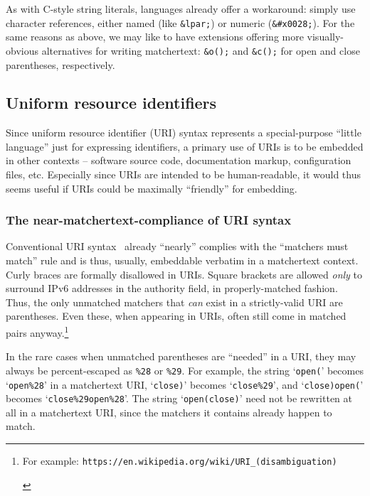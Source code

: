 As with C-style string literals,
\ml languages already offer a workaround:
simply use character references,
either named (like \verb|&lpar;|)
or numeric (\verb|&#x0028;|).
For the same reasons as above,
we may like to have extensions
offering more visually-obvious alternatives for writing matchertext:
\eg \verb|&o();| and \verb|&c();|
for open and close parentheses, 
respectively.


\subsection{Uniform resource identifiers}
\label{sec:embed:uri}

Since uniform resource identifier (URI) syntax represents
a special-purpose ``little language'' just for expressing identifiers,
a primary use of URIs is to be embedded in other contexts --
software source code, documentation markup, configuration files, etc.
Especially since URIs are intended to be human-readable,
it would thus seems useful if URIs
could be maximally ``friendly'' for embedding.

\subsubsection{The near-matchertext-compliance of URI syntax}

Conventional URI syntax~\cite{rfc3986}
already ``nearly'' complies with the ``matchers must match'' rule
and is thus, usually, embeddable verbatim in a matchertext context.
Curly braces are formally disallowed in URIs.
Square brackets are allowed \emph{only} to surround IPv6 addresses
in the authority field,
in properly-matched fashion.
Thus, the only unmatched matchers that \emph{can} exist
in a strictly-valid URI are parentheses.
Even these, when appearing in URIs,
often still come in matched pairs anyway.\footnote{\begin{tiny}
	For example:
	\texttt{https://en.wikipedia.org/wiki/URI\_(disambiguation)}
	\end{tiny}}

In the rare cases when unmatched parentheses are ``needed'' in a URI,
they may always be percent-escaped as \verb|%28| or \verb|%29|.
For example, the string `\verb|open(|'
becomes `\verb|open%28|' in a matchertext URI,
`\verb|close)|'
becomes `\verb|close%29|',
and `\verb|close)open(|' becomes
`\verb|close%29open%28|'.
The string `\verb|open(close)|'
need not be rewritten at all in a matchertext URI,
since the matchers it contains already happen to match.


